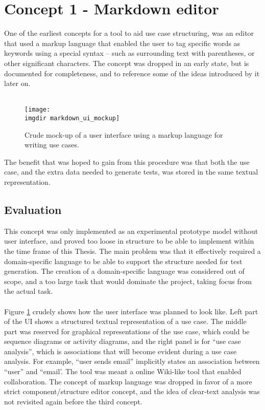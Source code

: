 \section{Concept 1 - Markdown editor}
One of the earliest concepts for a tool to aid use case structuring, was an editor that used a markup language that enabled the user to tag specific words as keywords using a special syntax -- such as surrounding text with parentheses, or other significant characters. The concept was dropped in an early state, but is documented for completeness, and to reference some of the ideas introduced by it later on.\\\\
\begin{figure}[!htbp]
  \centering
  \texttt{[image: \\imgdir markdown\_ui\_mockup]}
  \caption{Crude mock-up of a user interface using a markup language for writing use cases.}
\label{fig:markdown_ui_mockup}
\end{figure}The benefit that was hoped to gain from this procedure was that both the use case, and the extra data needed to generate tests, was stored in the same textual representation.
\subsection{Evaluation}
This concept was only implemented as an experimental prototype model without user interface, and proved too loose in structure to be able to implement within the time frame of this Thesis. The main problem was that it effectively required a domain-specific language to be able to support the structure needed for test generation. The creation of a domain-specific language was considered out of scope, and a too large task that would dominate the project, taking focus from the actual task.\\\\
Figure \ref{fig:markdown_ui_mockup} crudely shows how the user interface was planned to look like. Left part of the UI shows a structured textual representation of a use case. The middle part was reserved for graphical representations of the use case, which could be sequence diagrams or activity diagrams, and the right panel is for ``use case analysis'', which is associations that will become evident during a use case analysis. For example, ``user sends email'' implicitly states an association between ``user'' and ``email'. The tool was meant a online Wiki-like tool that enabled collaboration. The concept of markup language was dropped in favor of a more strict component/structure editor concept, and the idea of clear-text analysis was not revisited again before the third concept.

